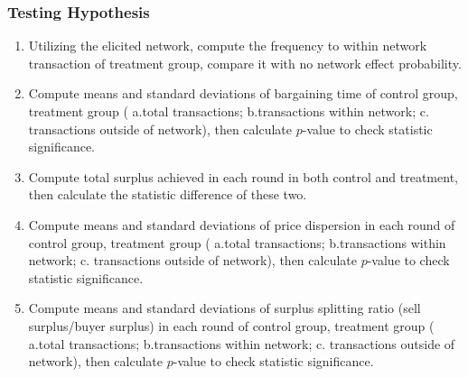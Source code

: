 \documentclass{article}
\begin{document}
\subsubsection{Testing Hypothesis}
\begin{enumerate}[{Hypothesis} 1]
    \item  Utilizing the elicited network, compute the frequency to within network
        transaction of treatment group, compare it with no network effect
        probability.
    \item  Compute means and standard deviations of bargaining time of control
        group, treatment group ( a.total transactions; b.transactions within
        network; c. transactions outside of network), then calculate $p$-value to check
        statistic significance.
    \item  Compute total surplus achieved in each round in both control and
        treatment, then calculate the statistic difference of these two.
    \item Compute means and standard deviations of price dispersion in each round of
        control group, treatment group ( a.total transactions; b.transactions within
        network; c. transactions outside of network), then calculate $p$-value to check
        statistic significance.
    \item Compute means and standard deviations of surplus splitting ratio (sell
            surplus/buyer surplus) in each round of control group, treatment group (
            a.total transactions; b.transactions within network; c. transactions outside of
        network), then calculate $p$-value to check statistic significance.
\end{enumerate}






%
%
%
\end{document}
